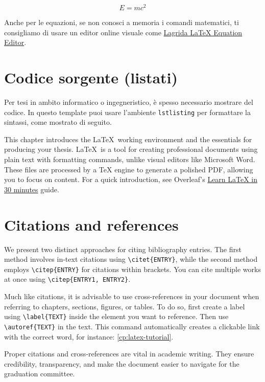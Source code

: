 {	\begin{equation}
		\label{eq:equation-01-it}
		E=mc^2
	\end{equation}
	
	Anche per le equazioni, se non conosci a memoria i comandi matematici, ti consigliamo di usare un editor online visuale come \href{https://latexeditor.lagrida.com/}{Lagrida LaTeX Equation Editor}.
	
	\section{Codice sorgente (listati)}
	Per tesi in ambito informatico o ingegneristico, è spesso necessario mostrare del codice. In questo template puoi usare l'ambiente \texttt{lstlisting} per formattare la sintassi, come mostrato di seguito.
	
}{%
	This chapter introduces the \LaTeX\ working environment and the essentials for producing your thesis. \LaTeX\ is a tool for creating professional documents using plain text with formatting commands, unlike visual editors like Microsoft Word. These files are processed by a TeX engine to generate a polished PDF, allowing you to focus on content. For a quick introduction, see Overleaf's \href{https://www.overleaf.com/learn/latex/Learn_LaTeX_in_30_minutes}{Learn LaTeX in 30 minutes} guide.
	
	\section{Citations and references}
	\label{sec:citations-en}
	We present two distinct approaches for citing bibliography entries. The first method involves in-text citations using \texttt{\textbackslash citet\{ENTRY\}}, while the second method employs \texttt{\textbackslash citep\{ENTRY\}} for citations within brackets. You can cite multiple works at once using \texttt{\textbackslash citep\{ENTRY1, ENTRY2\}}.
	
	Much like citations, it is advisable to use cross-references in your document when referring to chapters, sections, figures, or tables. To do so, first create a label using \texttt{\textbackslash label\{TEXT\}} inside the element you want to reference. Then use \texttt{\textbackslash autoref\{TEXT\}} in the text. This command automatically creates a clickable link with the correct word, for instance: \autoref{cp:latex-tutorial}.
	
	\begin{block}[tip]
		Proper citations and cross-references are vital in academic writing. They ensure credibility, transparency, and make the document easier to navigate for the graduation committee.
	\end{block}
	
}
